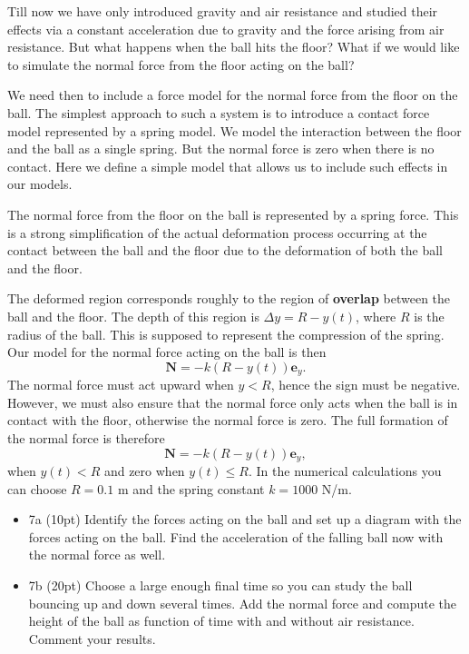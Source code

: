 \documentclass[%
oneside,                 %
final,                   %
10pt]{article}
\begin{document}
Till now we have only introduced gravity and air resistance and studied
their effects via a constant acceleration due to gravity and the force
arising from air resistance. But what happens when the ball hits the
floor? What if we would like to simulate the normal force from the floor acting on the ball?

We need then to include a force model for the normal force from
the floor on the ball. The simplest approach to such a system is to introduce a contact force
model represented by a spring model.  We model the interaction between the floor
and the ball as a single spring. But the normal force is zero when
there is no contact. Here  we define a simple model that allows us to include
such effects in our models.

The normal force from the floor on the ball is represented by a spring force. This
is a strong simplification of the actual deformation process occurring at the contact
between the ball and the floor due to the deformation of both the ball and the floor.

The deformed region corresponds roughly to the region of \textbf{overlap} between the
ball and the floor. The depth of this region is $\Delta y = R − y(t)$, where $R$
is the radius of the ball. This is supposed to represent the compression of the spring.
Our model for the normal force acting on the ball is then
\[
\bm{N} = −k (R − y(t)) \bm{e}_y. 
\]
The normal force must act upward when $y < R$,
hence the sign must be negative.
However, we must also ensure that the normal force only acts when the ball is in
contact with the floor, otherwise the normal force is zero. The full formation of the
normal force is therefore
\[
\bm{N} = −k (R − y(t)) \bm{e}_y, 
\]
when $y(t) < R$ and zero when $y(t) \le R$.
In the numerical calculations you can choose $R=0.1$ m and the spring constant $k=1000$ N/m.

\begin{itemize}
\item 7a (10pt) Identify the forces acting on the ball and set up a diagram with the forces acting on the ball. Find the acceleration of the falling ball now with the normal force as well.

\item 7b (20pt) Choose a large enough final time so you can study the ball bouncing up and down several times. Add the normal force and compute the height of the ball as function of time with and without air resistance. Comment your results.
\end{itemize}

\noindent

\end{document}
